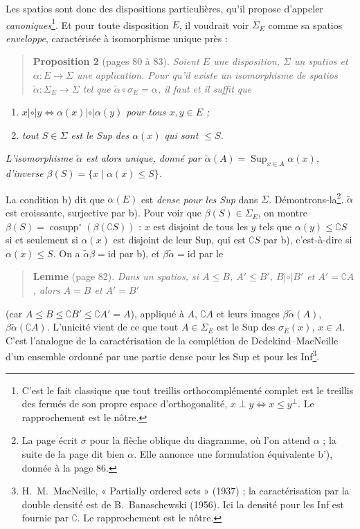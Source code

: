 \documentclass[11pt,a4paper]{article}
\begin{document}
Les spatios sont donc des dispositions particulières, qu'il propose d'appeler
\emph{canoniques}\footnote{C'est le fait classique que tout treillis
orthocomplémenté complet est le treillis des fermés de son propre espace
d'orthogonalité, $x \perp y \iff x \leq y^{\perp}$. Le rapprochement est le
nôtre.}. Et pour toute disposition $E$, il voudrait voir $\Sigma_{E}$ comme sa
spatios \emph{enveloppe}, caractérisée à isomorphisme unique près :

\begin{quote}
\textbf{Proposition 2} (pages 80 à 83). \emph{Soient $E$ une disposition, $\Sigma$
un spatios et $\alpha : E \to \Sigma$ une application. Pour qu'il existe un
isomorphisme de spatios $\tilde\alpha : \Sigma_{E} \to \Sigma$ tel que
$\tilde\alpha \circ \sigma_{E} = \alpha$, il faut et il suffit que}
\end{quote}
\begin{enumerate}
\item[a)] \emph{$x \mathrel{|\circ|} y \iff \alpha(x) \mathrel{|\circ|} \alpha(y)$
pour tous $x, y \in E$ ;}
\item[b)] \emph{tout $S \in \Sigma$ est le Sup des $\alpha(x)$ qui sont $\leq S$.}
\end{enumerate}
\emph{L'isomorphisme $\tilde\alpha$ est alors unique, donné par $\tilde\alpha(A) =
\operatorname{Sup}_{x \in A}\alpha(x)$, d'inverse $\beta(S) = \{x \mid \alpha(x)
\leq S\}$.}

La condition b) dit que $\alpha(E)$ est \emph{dense pour les Sup} dans $\Sigma$.
Démontrons-la\footnote{La page écrit $\sigma$ pour la flèche
oblique du diagramme, où l'on attend $\alpha$ ; la suite de la page dit bien
$\alpha$. Elle annonce une formulation équivalente b'), donnée à la page 86.}.
$\tilde\alpha$ est croissante, surjective par b). Pour voir que $\beta(S) \in
\Sigma_{E}$, on montre $\beta(S) = \operatorname{cosupp}^{\circ}(\beta(\complement
S))$ : $x$ est disjoint de tous les $y$ tels que $\alpha(y) \leq \complement S$
si et seulement si $\alpha(x)$ est disjoint de leur Sup, qui est $\complement S$
par b), c'est-à-dire si $\alpha(x) \leq S$. On a $\tilde\alpha\beta = \mathrm{id}$
par b), et $\beta\tilde\alpha = \mathrm{id}$ par le

\begin{quote}
\textbf{Lemme} (page 82). \emph{Dans un spatios, si $A \leq B$, $A' \leq B'$, $B
\mathrel{|\circ|} B'$ et $A' = \complement A$, alors $A = B$ et $A' = B'$}
\end{quote}

(car $A \leq B \leq \complement B' \leq \complement A' = A$),
appliqué à $A$, $\complement A$ et leurs images $\beta\tilde\alpha(A)$,
$\beta\tilde\alpha(\complement A)$. L'unicité vient de ce que tout $A \in
\Sigma_{E}$ est le Sup des $\sigma_{E}(x)$, $x \in A$. C'est l'analogue de
la caractérisation de la complétion de Dedekind--MacNeille d'un ensemble ordonné
par une partie dense pour les Sup et pour les Inf\footnote{H.~M.~MacNeille,
« Partially ordered sets » (1937) ; la caractérisation par la double densité est
de B.~Banaschewski (1956). Ici la densité pour les Inf est fournie par
$\complement$. Le rapprochement est le nôtre.}.
\end{document}
